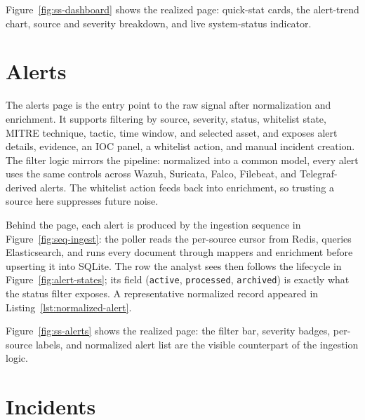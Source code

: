 Figure~\ref{fig:ss-dashboard} shows the realized page: quick-stat cards, the alert-trend chart, source and severity breakdown, and live system-status indicator.


\section{Alerts}

The alerts page is the entry point to the raw signal after normalization and enrichment. It supports filtering by source, severity, status, whitelist state, MITRE technique, tactic, time window, and selected asset, and exposes alert details, evidence, an IOC panel, a whitelist action, and manual incident creation. The filter logic mirrors the pipeline: normalized into a common model, every alert uses the same controls across Wazuh, Suricata, Falco, Filebeat, and Telegraf-derived alerts. The whitelist action feeds back into enrichment, so trusting a source here suppresses future noise.

Behind the page, each alert is produced by the ingestion sequence in Figure~\ref{fig:seq-ingest}: the poller reads the per-source cursor from Redis, queries Elasticsearch, and runs every document through mappers and enrichment before upserting it into SQLite. The row the analyst sees then follows the lifecycle in Figure~\ref{fig:alert-states}; its  field (\texttt{active}, \texttt{processed}, \texttt{archived}) is exactly what the status filter exposes. A representative normalized record appeared in Listing~\ref{lst:normalized-alert}.



Figure~\ref{fig:ss-alerts} shows the realized page: the filter bar, severity badges, per-source labels, and normalized alert list are the visible counterpart of the ingestion logic.


\section{Incidents}

